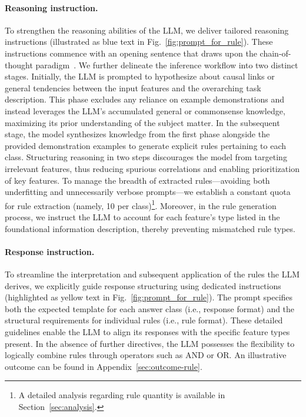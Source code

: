 \paragraph{Reasoning instruction.} To strengthen the reasoning abilities of the LLM, we deliver tailored reasoning instructions (illustrated as blue text in Fig.~\ref{fig:prompt_for_rule}). These instructions commence with an opening sentence that draws upon the chain-of-thought paradigm~\cite{wei2022chain}. We further delineate the inference workflow into two distinct stages. Initially, the LLM is prompted to hypothesize about causal links or general tendencies between the input features and the overarching task description. This phase excludes any reliance on example demonstrations and instead leverages the LLM's accumulated general or commonsense knowledge, maximizing its prior understanding of the subject matter. In the subsequent stage, the model synthesizes knowledge from the first phase alongside the provided demonstration examples to generate explicit rules pertaining to each class. Structuring reasoning in two steps discourages the model from targeting irrelevant features, thus reducing spurious correlations and enabling prioritization of key features. To manage the breadth of extracted rules—avoiding both underfitting and unnecessarily verbose prompts—we establish a constant quota for rule extraction (namely, 10 per class)\footnote{A detailed analysis regarding rule quantity is available in Section~\ref{sec:analysis}.}. Moreover, in the rule generation process, we instruct the LLM to account for each feature's type listed in the foundational information description, thereby preventing mismatched rule types.

\vspace*{-0.12in}
\paragraph{Response instruction.} To streamline the interpretation and subsequent application of the rules the LLM derives, we explicitly guide response structuring using dedicated instructions (highlighted as yellow text in Fig.~\ref{fig:prompt_for_rule}). The prompt specifies both the expected template for each answer class (i.e., response format) and the structural requirements for individual rules (i.e., rule format). These detailed guidelines enable the LLM to align its responses with the specific feature types present. In the absence of further directives, the LLM possesses the flexibility to logically combine rules through operators such as AND or OR. An illustrative outcome can be found in Appendix~\ref{sec:outcome-rule}.

